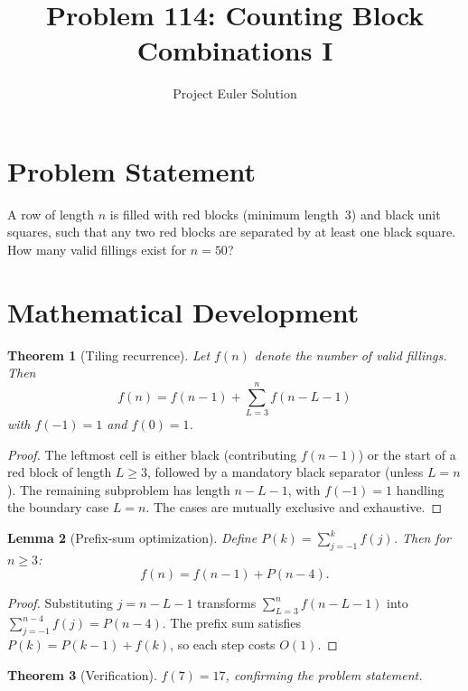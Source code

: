 \documentclass[12pt]{article}
\title{Problem 114: Counting Block Combinations I}
\author{Project Euler Solution}
\date{}
\newtheorem{theorem}{Theorem}
\newtheorem{lemma}[theorem]{Lemma}
\begin{document}
\maketitle

\section{Problem Statement}

A row of length $n$ is filled with red blocks (minimum length~3) and black unit squares, such that any two red blocks are separated by at least one black square. How many valid fillings exist for $n = 50$?

\section{Mathematical Development}

\begin{theorem}[Tiling recurrence]
Let $f(n)$ denote the number of valid fillings. Then
\[
f(n) = f(n-1) + \sum_{L=3}^{n} f(n - L - 1)
\]
with $f(-1) = 1$ and $f(0) = 1$.
\end{theorem}

\begin{proof}
The leftmost cell is either black (contributing $f(n-1)$) or the start of a red block of length $L \ge 3$, followed by a mandatory black separator (unless $L = n$). The remaining subproblem has length $n - L - 1$, with $f(-1) = 1$ handling the boundary case $L = n$. The cases are mutually exclusive and exhaustive.
\end{proof}

\begin{lemma}[Prefix-sum optimization]
Define $P(k) = \sum_{j=-1}^{k} f(j)$. Then for $n \ge 3$:
\[
f(n) = f(n-1) + P(n-4).
\]
\end{lemma}

\begin{proof}
Substituting $j = n - L - 1$ transforms $\sum_{L=3}^{n} f(n-L-1)$ into $\sum_{j=-1}^{n-4} f(j) = P(n-4)$. The prefix sum satisfies $P(k) = P(k-1) + f(k)$, so each step costs $O(1)$.
\end{proof}

\begin{theorem}[Verification]
$f(7) = 17$, confirming the problem statement.
\end{theorem}
\end{document}

